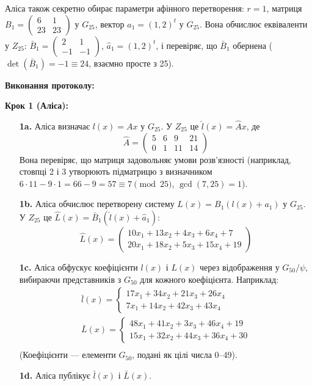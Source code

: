 Аліса також секретно обирає параметри афінного перетворення: $r=1$, матриця $B_1 = \begin{pmatrix}
                                                                                       6 & 1 \\ 23 & 23
\end{pmatrix}$ у $G_{25}$, вектор $a_1 = (1, 2)^t$ у $G_{25}$.
Вона обчислює еквіваленти у $Z_{25}$: $\bar{B}_1 = \begin{pmatrix}
                                                                                                                      2 & 1 \\ -1 & -1
\end{pmatrix}$, $\hat{a}_1 = (1, 2)^t$, і перевіряє, що $\bar{B}_1$ обернена ($\det(\bar{B}_1) = -1 \equiv 24$, взаємно просте з 25).

\textbf{Виконання протоколу:}

\textbf{Крок 1 (Аліса):}
\begin{itemize}
    \item[\textbf{1a.}] Аліса визначає $l(x) = Ax$ у $G_{25}$. У $Z_{25}$ це $\hat{l}(x) = \hat{A}x$, де
    \[
        \hat{A} = \begin{pmatrix}
                      5 & 6 & 9 & 21 \\ 0 & 1 & 11 & 14
        \end{pmatrix}
    \]
    Вона перевіряє, що матриця задовольняє умови розв'язності (наприклад, стовпці 2 і 3 утворюють підматрицю з визначником $6 \cdot 11 - 9 \cdot 1 = 66 - 9 = 57 \equiv 7 \pmod{25}$, $\gcd(7,25)=1$).
    \item[\textbf{1b.}] Аліса обчислює перетворену систему $L(x) = B_1(l(x) + a_1)$ у $G_{25}$. У $Z_{25}$ це $\hat{L}(x) = \bar{B}_1(\hat{l}(x) + \hat{a}_1)$:
    \[
        \hat{L}(x) = \begin{pmatrix}
                         10x_1 + 13x_2 + 4x_3 + 6x_4 + 7 \\ 20x_1 + 18x_2 + 5x_3 + 15x_4 + 19
        \end{pmatrix}
    \]
    \item[\textbf{1c.}] Аліса обфускує коефіцієнти $l(x)$ і $L(x)$ через відображення у $G_{50}/\psi$, вибираючи представників з $G_{50}$ для кожного коефіцієнта. Наприклад:
    \begin{gather*}
        \bar{l}(x) = \begin{cases}
                         17x_1 + 34x_2 + 21x_3 + 26x_4 \\ 7x_1 + 14x_2 + 42x_3 + 43x_4
        \end{cases}\\
        \bar{L}(x) = \begin{cases}
                         48x_1 + 41x_2 + 3x_3 + 46x_4 + 19 \\ 15x_1 + 32x_2 + 44x_3 + 36x_4 + 30
        \end{cases}\\
    \end{gather*}
    (Коефіцієнти — елементи $G_{50}$, подані як цілі числа 0–49).
    \item[\textbf{1d.}] Аліса публікує $\bar{l}(x)$ і $\bar{L}(x)$.
\end{itemize}

